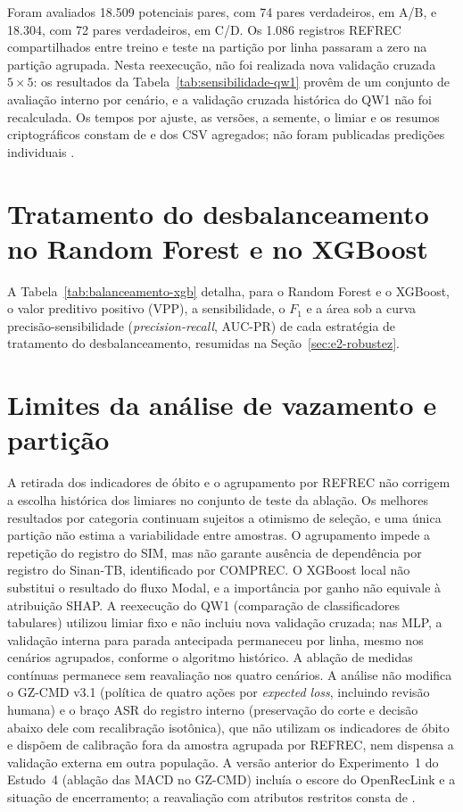 Foram avaliados 18.509 potenciais pares, com 74 pares verdadeiros, em A/B, e 18.304, com 72 pares verdadeiros, em C/D. Os 1.086 registros REFREC compartilhados entre treino e teste na partição por linha passaram a zero na partição agrupada. Nesta reexecução, não foi realizada nova validação cruzada $5 \times 5$: os resultados da Tabela~\ref{tab:sensibilidade-qw1} provêm de um conjunto de avaliação interno por cenário, e a validação cruzada histórica do QW1 não foi recalculada. Os tempos por ajuste, as versões, a semente, o limiar e os resumos criptográficos constam de  e dos CSV agregados; não foram publicadas predições individuais \cite{Jardim2026phdrepo}.

\section{Tratamento do desbalanceamento no Random Forest e no XGBoost}\label{sec:sensibilidade-balanceamento}

A Tabela~\ref{tab:balanceamento-xgb} detalha, para o Random Forest e o XGBoost, o valor preditivo positivo (VPP), a sensibilidade, o $F_1$ e a área sob a curva precisão-sensibilidade (\textit{precision-recall}, AUC-PR) de cada estratégia de tratamento do desbalanceamento, resumidas na Seção~\ref{sec:e2-robustez}.



\section{Limites da análise de vazamento e partição}

A retirada dos indicadores de óbito e o agrupamento por REFREC não corrigem a escolha histórica dos limiares no conjunto de teste da ablação. Os melhores resultados por categoria continuam sujeitos a otimismo de seleção, e uma única partição não estima a variabilidade entre amostras. O agrupamento impede a repetição do registro do SIM, mas não garante ausência de dependência por registro do Sinan-TB, identificado por COMPREC. O XGBoost local não substitui o resultado do fluxo Modal, e a importância por ganho não equivale à atribuição SHAP. A reexecução do QW1 (comparação de classificadores tabulares) utilizou limiar fixo e não incluiu nova validação cruzada; nas MLP, a validação interna para parada antecipada permaneceu por linha, mesmo nos cenários agrupados, conforme o algoritmo histórico. A ablação de medidas contínuas permanece sem reavaliação nos quatro cenários. A análise não modifica o GZ-CMD v3.1 (política de quatro ações por \textit{expected loss}, incluindo revisão humana) e o braço ASR do registro interno (preservação do corte e decisão abaixo dele com recalibração isotônica), que não utilizam os indicadores de óbito e dispõem de calibração fora da amostra agrupada por REFREC, nem dispensa a validação externa em outra população. A versão anterior do Experimento~1 do Estudo~4 (ablação das MACD no GZ-CMD) incluía o escore do OpenRecLink e a situação de encerramento; a reavaliação com atributos restritos consta de  \cite{Jardim2026phdrepo}.
